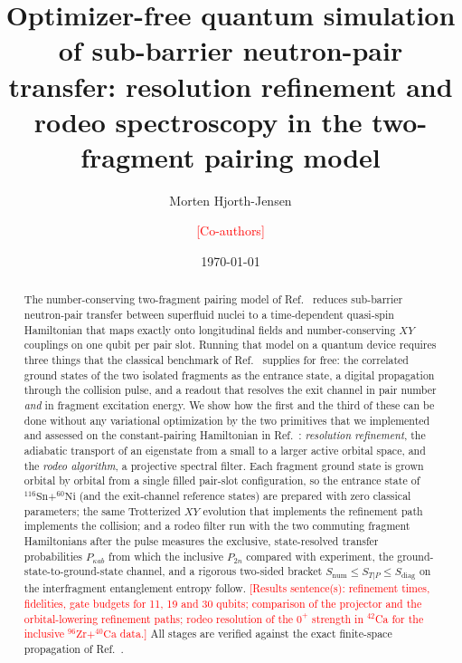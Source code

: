 \documentclass[
  aps,
  prc,
  reprint,
  superscriptaddress,
  floatfix,
  nofootinbib
]{revtex4-2}
\newcommand{\todo}[1]{\textcolor{red}{[#1]}}
\newcommand{\Snum}{S_{\mathrm{num}}}
\newcommand{\Sdiag}{S_{\mathrm{diag}}}
\newcommand{\Sn}{^{116}\mathrm{Sn}}
\newcommand{\Ni}{^{60}\mathrm{Ni}}
\newcommand{\Zr}{^{96}\mathrm{Zr}}
\newcommand{\Ca}{^{40}\mathrm{Ca}}
\begin{document}
\title{Optimizer-free quantum simulation of sub-barrier neutron-pair transfer:
resolution refinement and rodeo spectroscopy in the two-fragment pairing model}

\author{Morten Hjorth-Jensen}
\author{\todo{Co-authors}}
\affiliation{\todo{Affiliations}}
\date{\today}

\begin{abstract}
The number-conserving two-fragment pairing model of
Ref.~\cite{TwoFragment2026} reduces sub-barrier neutron-pair transfer between
superfluid nuclei to a time-dependent quasi-spin Hamiltonian that maps
exactly onto longitudinal fields and number-conserving $XY$ couplings on one
qubit per pair slot.  Running that model on a quantum device requires three
things that the classical benchmark of Ref.~\cite{TwoFragment2026} supplies
for free: the correlated ground states of the two isolated fragments as the
entrance state, a digital propagation through the collision pulse, and a
readout that resolves the exit channel in pair number \emph{and} in
fragment excitation energy.  We show how the first and the third of these
can be done without any variational optimization by the two primitives that
we implemented and assessed on the constant-pairing Hamiltonian in
Ref.~\cite{EigenQPairing2026}: \emph{resolution refinement}, the adiabatic
transport of an eigenstate from a small to a larger active orbital space,
and the \emph{rodeo algorithm}, a projective spectral filter.  Each fragment
ground state is grown orbital by orbital from a single filled pair-slot
configuration, so the entrance state of $\Sn+\Ni$ (and the exit-channel
reference states) are prepared with zero classical parameters; the same
Trotterized $XY$ evolution that implements the refinement path implements the
collision; and a rodeo filter run with the two commuting fragment
Hamiltonians after the pulse measures the exclusive, state-resolved transfer
probabilities $P_{\kappa ab}$ from which the inclusive $P_{2n}$ compared with
experiment, the ground-state-to-ground-state channel, and a rigorous
two-sided bracket $\Snum\le S_{T|P}\le\Sdiag$ on the interfragment
entanglement entropy follow.  \todo{Results sentence(s): refinement times,
fidelities, gate budgets for 11, 19 and 30 qubits; comparison of the
projector and the orbital-lowering refinement paths; rodeo resolution of
the $0^+$ strength in $^{42}$Ca for the inclusive $\Zr+\Ca$ data.}  All
stages are verified against the exact finite-space propagation of
Ref.~\cite{TwoFragment2026}.
\end{abstract}
\end{document}
